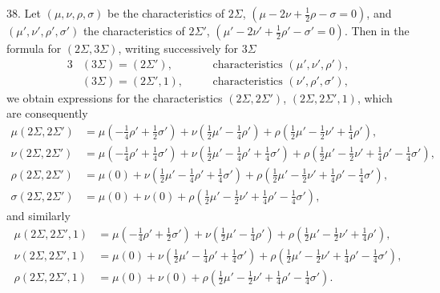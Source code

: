 \documentclass[12pt,a4paper]{article}
\begin{document}
38. Let $(\mu, \nu, \rho, \sigma)$ be the characteristics of $2\Sigma$, $(\mu - 2\nu + \tfrac{1}{2}\rho - \sigma = 0)$, and $(\mu', \nu', \rho', \sigma')$ the characteristics of $2\Sigma'$, $(\mu' - 2\nu' + \tfrac{1}{2}\rho' - \sigma' = 0)$. Then in the formula for $(2\Sigma, 3\Sigma)$, writing successively for $3\Sigma$
\begin{alignat*}{3}
&(3\Sigma) = (2\Sigma'),\quad &&\text{characteristics }(\mu', \nu', \rho'),\\
&(3\Sigma) = (2\Sigma', 1),\quad &&\text{characteristics }(\nu', \rho', \sigma'),
\end{alignat*}
we obtain expressions for the characteristics $(2\Sigma, 2\Sigma')$, $(2\Sigma, 2\Sigma', 1)$, which are consequently
\begin{align*}
\mu(2\Sigma, 2\Sigma') &= \mu(-\tfrac{1}{4}\rho' + \tfrac{1}{2}\sigma') + \nu(\tfrac{1}{2}\mu' - \tfrac{1}{4}\rho') + \rho(\tfrac{1}{2}\mu' - \tfrac{1}{2}\nu' + \tfrac{1}{4}\rho'),\\
\nu(2\Sigma, 2\Sigma') &= \mu(-\tfrac{1}{4}\rho' + \tfrac{1}{4}\sigma') + \nu(\tfrac{1}{2}\mu' - \tfrac{1}{4}\rho' + \tfrac{1}{4}\sigma') + \rho(\tfrac{1}{2}\mu' - \tfrac{1}{2}\nu' + \tfrac{1}{4}\rho' - \tfrac{1}{4}\sigma'),\\
\rho(2\Sigma, 2\Sigma') &= \mu(0) + \nu(\tfrac{1}{2}\mu' - \tfrac{1}{4}\rho' + \tfrac{1}{4}\sigma') + \rho(\tfrac{1}{2}\mu' - \tfrac{1}{2}\nu' + \tfrac{1}{4}\rho' - \tfrac{1}{4}\sigma'),\\
\sigma(2\Sigma, 2\Sigma') &= \mu(0) + \nu(0) + \rho(\tfrac{1}{2}\mu' - \tfrac{1}{2}\nu' + \tfrac{1}{4}\rho' - \tfrac{1}{4}\sigma'),
\end{align*}
and similarly
\begin{align*}
\mu(2\Sigma, 2\Sigma', 1) &= \mu(-\tfrac{1}{4}\rho' + \tfrac{1}{2}\sigma') + \nu(\tfrac{1}{2}\mu' - \tfrac{1}{4}\rho') + \rho(\tfrac{1}{2}\mu' - \tfrac{1}{2}\nu' + \tfrac{1}{4}\rho'),\\
\nu(2\Sigma, 2\Sigma', 1) &= \mu(0) + \nu(\tfrac{1}{2}\mu' - \tfrac{1}{4}\rho' + \tfrac{1}{4}\sigma') + \rho(\tfrac{1}{2}\mu' - \tfrac{1}{2}\nu' + \tfrac{1}{4}\rho' - \tfrac{1}{4}\sigma'),\\
\rho(2\Sigma, 2\Sigma', 1) &= \mu(0) + \nu(0) + \rho(\tfrac{1}{2}\mu' - \tfrac{1}{2}\nu' + \tfrac{1}{4}\rho' - \tfrac{1}{4}\sigma').
\end{align*}
\end{document}
